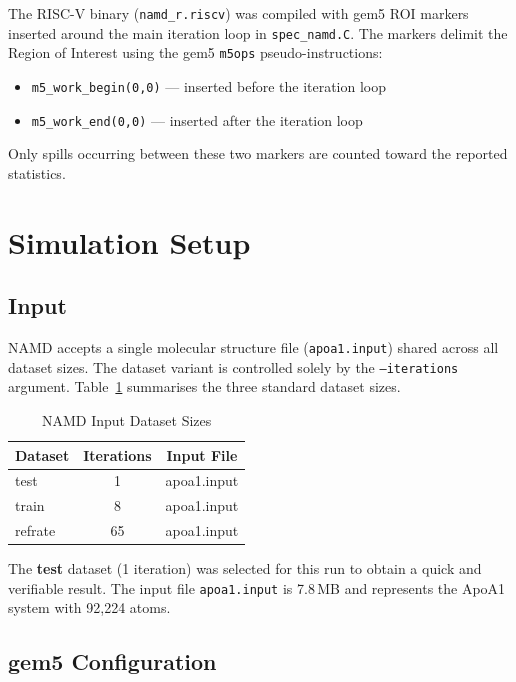 \documentclass[conference]{IEEEtran}
\begin{document}
The RISC-V binary (\texttt{namd\_r.riscv}) was compiled with gem5 ROI
markers inserted around the main iteration loop in \texttt{spec\_namd.C}.
The markers delimit the Region of Interest using the gem5 \texttt{m5ops}
pseudo-instructions:

\begin{itemize}
    \item \texttt{m5\_work\_begin(0,0)} — inserted before the iteration loop
    \item \texttt{m5\_work\_end(0,0)}   — inserted after  the iteration loop
\end{itemize}

Only spills occurring between these two markers are counted toward the
reported statistics.

\section{Simulation Setup}

\subsection{Input}

NAMD accepts a single molecular structure file (\texttt{apoa1.input})
shared across all dataset sizes. The dataset variant is controlled
solely by the \texttt{--iterations} argument. Table~\ref{tab:inputs}
summarises the three standard dataset sizes.

\begin{table}[H]
\centering
\caption{NAMD Input Dataset Sizes}
\label{tab:inputs}
\begin{tabular}{lcc}
\toprule
\textbf{Dataset} & \textbf{Iterations} & \textbf{Input File} \\
\midrule
test     & 1  & apoa1.input \\
train    & 8  & apoa1.input \\
refrate  & 65 & apoa1.input \\
\bottomrule
\end{tabular}
\end{table}

The \textbf{test} dataset (1 iteration) was selected for this run to
obtain a quick and verifiable result. The input file \texttt{apoa1.input}
is 7.8\,MB and represents the ApoA1 system with 92,224 atoms.

\subsection{gem5 Configuration}
\end{document}
